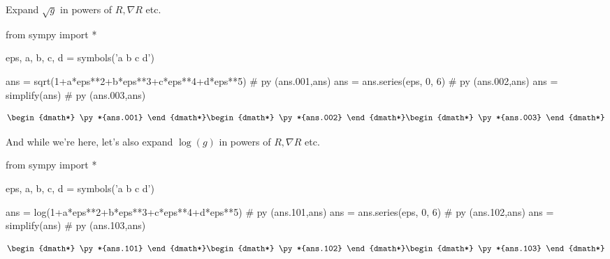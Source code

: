 \documentclass[12pt]{pylatex}
\begin{document}
Expand $\sqrt{g}$ in powers of $R,\nabla R$ etc.

\begin{python}
   from sympy import *

   eps, a, b, c, d = symbols('\epsilon a b c d')

   ans = sqrt(1+a*eps**2+b*eps**3+c*eps**4+d*eps**5)   # py (ans.001,ans)
   ans = ans.series(eps, 0, 6)                         # py (ans.002,ans)
   ans = simplify(ans)                                 # py (ans.003,ans)

\end{python}

\begin{dgroup*}
   \begin{dmath*} \py*{ans.001} \end{dmath*}
   \begin{dmath*} \py*{ans.002} \end{dmath*}
   \begin{dmath*} \py*{ans.003} \end{dmath*}
\end{dgroup*}

And while we're here, let's also expand $\log(g)$ in powers of $R,\nabla R$ etc.

\begin{python}
   from sympy import *

   eps, a, b, c, d = symbols('\epsilon a b c d')

   ans = log(1+a*eps**2+b*eps**3+c*eps**4+d*eps**5)    # py (ans.101,ans)
   ans = ans.series(eps, 0, 6)                         # py (ans.102,ans)
   ans = simplify(ans)                                 # py (ans.103,ans)

\end{python}

\begin{dgroup*}
   \begin{dmath*} \py*{ans.101} \end{dmath*}
   \begin{dmath*} \py*{ans.102} \end{dmath*}
   \begin{dmath*} \py*{ans.103} \end{dmath*}
\end{dgroup*}
\end{document}
